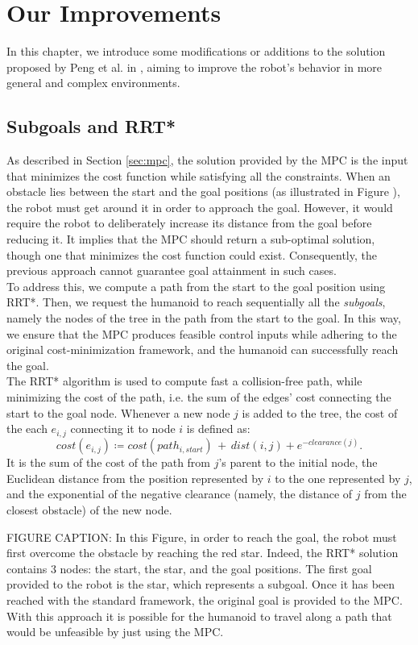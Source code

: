 \section{Our Improvements}\label{sec:improvements}

In this chapter, we introduce some modifications or additions to the solution proposed by Peng et al. in \cite{peng_main_paper}, aiming to improve the robot's behavior in more general and complex environments.

\subsection{Subgoals and RRT*}
As described in Section \ref{sec:mpc}, the solution provided by the MPC is the input that minimizes the cost function while satisfying all the constraints. When an obstacle lies between the start and the goal positions (as illustrated in Figure ), the robot must get around it in order to approach the goal. However, it would require the robot to deliberately increase its distance from the goal before reducing it. It implies that the MPC should return a sub-optimal solution, though one that minimizes the cost function could exist. Consequently, the previous approach cannot guarantee goal attainment in such cases.\\
To address this, we compute a path from the start to the goal position using RRT*. Then, we request the humanoid to reach sequentially all the \textit{subgoals}, namely the nodes of the tree in the path from the start to the goal. In this way, we ensure that the MPC produces feasible control inputs while adhering to the original cost-minimization framework, and the humanoid can successfully reach the goal.\\
The RRT* algorithm is used to compute fast a collision-free path, while minimizing the cost of the path, i.e. the sum of the edges' cost connecting the start to the goal node. Whenever a new node $j$ is added to the tree, the cost of the each $e_{i,j}$ connecting it to node $i$ is defined as:
$$ cost(e_{i, j}) \coloneqq  cost(path_{i,start})\, +\,dist(i, j) + e^{-clearance(j)}. $$
It is the sum of the cost of the path from $j$'s parent to the initial node, the Euclidean distance from the position represented by $i$ to the one represented by $j$, and the exponential of the negative clearance (namely, the distance of $j$ from the closest obstacle) of the new node.

FIGURE CAPTION:
In this Figure, in order to reach the goal, the robot must first overcome the obstacle by reaching the red star. Indeed, the RRT* solution contains 3 nodes: the start, the star, and the goal positions. The first goal provided to the robot is the star, which represents a subgoal. Once it has been reached with the standard framework, the original goal is provided to the MPC. With this approach it is possible for the humanoid to travel along a path that would be unfeasible by just using the MPC.



